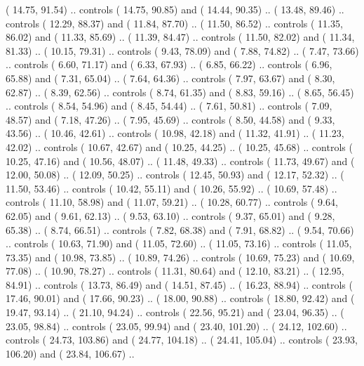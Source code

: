 {        (  14.75,  91.54) .. controls (  14.75,  90.85) and (  14.44,  90.35) ..
        (  13.48,  89.46) .. controls (  12.29,  88.37) and (  11.84,  87.70) ..
        (  11.50,  86.52) .. controls (  11.35,  86.02) and (  11.33,  85.69) ..
        (  11.39,  84.47) .. controls (  11.50,  82.02) and (  11.34,  81.33) ..
        (  10.15,  79.31) .. controls (   9.43,  78.09) and (   7.88,  74.82) ..
        (   7.47,  73.66) .. controls (   6.60,  71.17) and (   6.33,  67.93) ..
        (   6.85,  66.22) .. controls (   6.96,  65.88) and (   7.31,  65.04) ..
        (   7.64,  64.36) .. controls (   7.97,  63.67) and (   8.30,  62.87) ..
        (   8.39,  62.56) .. controls (   8.74,  61.35) and (   8.83,  59.16) ..
        (   8.65,  56.45) .. controls (   8.54,  54.96) and (   8.45,  54.44) ..
        (   7.61,  50.81) .. controls (   7.09,  48.57) and (   7.18,  47.26) ..
        (   7.95,  45.69) .. controls (   8.50,  44.58) and (   9.33,  43.56) ..
        (  10.46,  42.61) .. controls (  10.98,  42.18) and (  11.32,  41.91) ..
        (  11.23,  42.02) .. controls (  10.67,  42.67) and (  10.25,  44.25) ..
        (  10.25,  45.68) .. controls (  10.25,  47.16) and (  10.56,  48.07) ..
        (  11.48,  49.33) .. controls (  11.73,  49.67) and (  12.00,  50.08) ..
        (  12.09,  50.25) .. controls (  12.45,  50.93) and (  12.17,  52.32) ..
        (  11.50,  53.46) .. controls (  10.42,  55.11) and (  10.26,  55.92) ..
        (  10.69,  57.48) .. controls (  11.10,  58.98) and (  11.07,  59.21) ..
        (  10.28,  60.77) .. controls (   9.64,  62.05) and (   9.61,  62.13) ..
        (   9.53,  63.10) .. controls (   9.37,  65.01) and (   9.28,  65.38) ..
        (   8.74,  66.51) .. controls (   7.82,  68.38) and (   7.91,  68.82) ..
        (   9.54,  70.66) .. controls (  10.63,  71.90) and (  11.05,  72.60) ..
        (  11.05,  73.16) .. controls (  11.05,  73.35) and (  10.98,  73.85) ..
        (  10.89,  74.26) .. controls (  10.69,  75.23) and (  10.69,  77.08) ..
        (  10.90,  78.27) .. controls (  11.31,  80.64) and (  12.10,  83.21) ..
        (  12.95,  84.91) .. controls (  13.73,  86.49) and (  14.51,  87.45) ..
        (  16.23,  88.94) .. controls (  17.46,  90.01) and (  17.66,  90.23) ..
        (  18.00,  90.88) .. controls (  18.80,  92.42) and (  19.47,  93.14) ..
        (  21.10,  94.24) .. controls (  22.56,  95.21) and (  23.04,  96.35) ..
        (  23.05,  98.84) .. controls (  23.05,  99.94) and (  23.40, 101.20) ..
        (  24.12, 102.60) .. controls (  24.73, 103.86) and (  24.77, 104.18) ..
        (  24.41, 105.04) .. controls (  23.93, 106.20) and (  23.84, 106.67) ..
}
